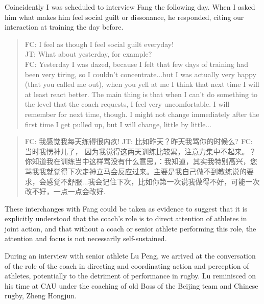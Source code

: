   Coincidently I was scheduled to interview Fang the following day.  When I asked him what makes him feel social guilt or dissonance, he responded, citing our interaction at training the day before.

  \begin{quotation}
    FC: I feel as though I feel social guilt everyday! \\
    JT: What about yesterday, for example? \\
    FC: Yesterday I was dazed, because I felt that few days of training had been very tiring, so I couldn't concentrate...but I was actually very happy (that you called me out), when you yell at me I think that next time I will at least react better.  The main thing is that when I can't do something to the level that the coach requests, I feel very uncomfortable.  I will remember for next time, though.  I might not change immediately after the first time I get pulled up, but I will change, little by little... \\
  \end{quotation}

  \begin{quotation}
    FC: 我感觉我每天练得很内疚!
    JT: 比如昨天？昨天我骂你的时候么?
    FC: 当时我愣神儿了， 因为我觉得这两天训练比较累，注意力集中不起来。？你知道我在训练当中这样骂没有什么意思，：我知道，其实我特别高兴，您骂我我就觉得下次走神立马会反应过来。主要是我自己做不到教练说的要求，会感觉不舒服...我会记住下次，比如你第一次说我做得不好，可能一次改不好，一点一点会改好.
  \end{quotation}

  These interchanges with Fang could be taken as evidence to suggest that it is explicitly understood that the coach's role is to direct attention of athletes in joint action, and that without a coach or senior athlete performing this role, the attention and focus is not necessarily self-sustained.

  During an interview with senior athlete Lu Peng, we arrived at the conversation of the role of the coach in directing and coordinating action and perception of athletes, potentially to the detriment of performance in rugby. Lu reminisced on his time at CAU under the coaching of old Boss of the Beijing team and Chinese rugby, Zheng Hongjun.


